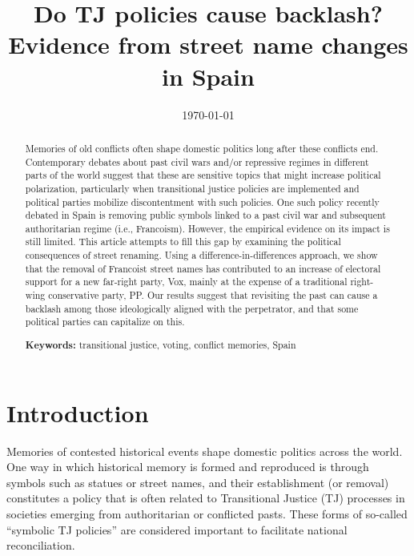 \documentclass[12pt, titlepage]{article}
\title{\Large Do TJ policies cause backlash?\\Evidence from street name changes in Spain}
\author{}
\date{\today}
\begin{document}
\maketitle

\begin{abstract}
\noindent
Memories of old conflicts often shape domestic politics long after these conflicts end. Contemporary debates about past civil wars and/or repressive regimes in different parts of the world suggest that these are sensitive topics that might increase political polarization, particularly when transitional justice policies are implemented and political parties mobilize discontentment with such policies. One such policy recently debated in Spain is removing public symbols linked to a past civil war and subsequent authoritarian regime (i.e., Francoism). However, the empirical evidence on its impact is still limited. This article attempts to fill this gap by examining the political consequences of street renaming. Using a difference-in-differences approach, we show that the removal of Francoist street names has contributed to an increase of electoral support for a new far-right party, Vox, mainly at the expense of a traditional right-wing conservative party, PP. Our results suggest that revisiting the past can cause a backlash among those ideologically aligned with the perpetrator, and that some political parties can capitalize on this.

\vspace{10pt}\noindent
\textbf{Keywords:} transitional justice, voting, conflict memories, Spain

\vspace{10pt}
\noindent

\end{abstract}

\newpage
\section*{Introduction}

Memories of contested historical events shape domestic politics across the world. One way in which historical memory is formed and reproduced is through symbols such as statues or street names, and their establishment (or removal) constitutes a policy that is often related to Transitional Justice (TJ) processes in societies emerging from authoritarian or conflicted pasts. These forms of so-called ``symbolic TJ policies'' are considered important to facilitate national reconciliation.
\end{document}
